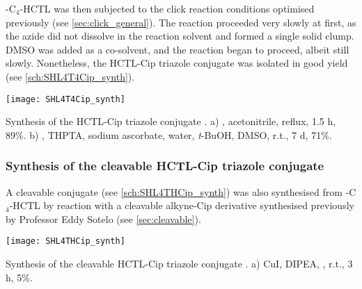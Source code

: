 -C$_4$-HCTL  was then subjected to the click reaction conditions optimised previously (see \ref{sec:click_general}). The reaction proceeded very slowly at first, as the azide did not dissolve in the reaction solvent and formed a single solid clump. DMSO was added as a co-solvent, and the reaction began to proceed, albeit still slowly.  Nonetheless, the HCTL-Cip triazole conjugate  was isolated in good yield (see \ref{sch:SHL4T4Cip_synth}).

\begin{scheme}[H]
	\begin{center}
		\texttt{[image: SHL4T4Cip\_synth]}
		\caption{
			Synthesis of the HCTL-Cip triazole conjugate .
			a) , acetonitrile, reflux, 1.5 h, 89\%.
			b) , THPTA, sodium ascorbate, water, \textit{t}-BuOH, DMSO, r.t., 7 d, 71\%.
			\label{sch:SHL4T4Cip_synth}}
	\end{center}
\end{scheme}

\subsubsection{Synthesis of the cleavable HCTL-Cip triazole conjugate }

A cleavable conjugate  (see \ref{sch:SHL4THCip_synth}) was also synthesised from -C$_4$-HCTL  by reaction with a cleavable alkyne-Cip derivative  synthesised previously by Professor Eddy Sotelo (see \ref{sec:cleavable}).

\begin{scheme}[H]
	\begin{center}
		\texttt{[image: SHL4THCip\_synth]}
		\caption{
			Synthesis of the cleavable HCTL-Cip triazole conjugate .
			a) CuI, DIPEA, , r.t., 3 h, 5\%.
			\label{sch:SHL4THCip_synth}}
	\end{center}
\end{scheme}